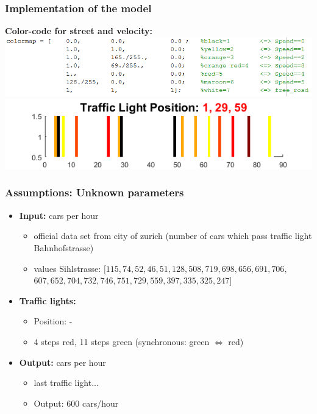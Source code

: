 \documentclass[9pt]{beamer}
\begin{document}
\begin{frame}
\frametitle{Implementation of the model}
\textbf{Color-code for street and velocity:}\\


\vspace{1cm}
\includegraphics[width=1.\columnwidth]{colormap.png}\vspace{1cm}
\includegraphics[width=0.75\columnwidth]{tl.png}

\end{frame}

\begin{frame}
\frametitle{Assumptions: Unknown parameters}
\begin{itemize}
\item \textbf{Input:} cars per hour
\begin{itemize}
\item official data set from city of zurich (number of cars which pass traffic light Bahnhofstrasse)
\item values Sihlstrasse:
$[115,74,52,46,51,128,508,719,698,656,691,706,$\\
$607,652,704,732,746,751,729,559,397,335,325,247]$
\end{itemize}
\vspace{.5cm}
\item \textbf{Traffic lights:} 
\begin{itemize}
\item Position: -
\item 4 steps red, 11 steps green (synchronous: green $\Leftrightarrow$ red)
\end{itemize}
\vspace{0.5cm}
\item \textbf{Output:} cars per hour
\begin{itemize}
\item last traffic light... 

\item Output: 600 cars/hour

\end{itemize}

\end{itemize}

\end{frame}
\end{document}
